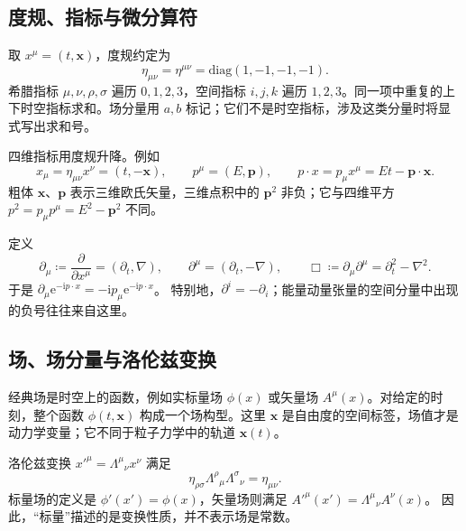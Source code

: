 \subsection{度规、指标与微分算符}

取 $x^{\mu}=(t,\bm{x})$，度规约定为
\begin{equation}
  \eta_{\mu\nu}=\eta^{\mu\nu}=\mathrm{diag}(1,-1,-1,-1).
\end{equation}
希腊指标 $\mu,\nu,\rho,\sigma$ 遍历 $0,1,2,3$，空间指标 $i,j,k$ 遍历 $1,2,3$。同一项中重复的上下时空指标求和。场分量用 $a,b$ 标记；它们不是时空指标，涉及这类分量时将显式写出求和号。

四维指标用度规升降。例如
\begin{equation}
  x_{\mu}=\eta_{\mu\nu}x^{\nu}=(t,-\bm{x}),
  \qquad p^{\mu}=(E,\bm{p}),
  \qquad p\cdot x=p_{\mu}x^{\mu}=Et-\bm{p}\cdot\bm{x}.
\end{equation}
粗体 $\bm{x}$、$\bm{p}$ 表示三维欧氏矢量，三维点积中的 $\bm{p}^{2}$ 非负；它与四维平方 $p^{2}=p_{\mu}p^{\mu}=E^{2}-\bm{p}^{2}$ 不同。

定义
\begin{equation}
  \partial_{\mu}\coloneqq\frac{\partial}{\partial x^{\mu}}
  =(\partial_{t},\nabla),\qquad
  \partial^{\mu}=(\partial_{t},-\nabla),\qquad
  \Box\coloneqq\partial_{\mu}\partial^{\mu}=\partial_{t}^{2}-\nabla^{2}.
\end{equation}
于是 $\partial_{\mu}\mathrm{e}^{-\mathrm{i}p\cdot x}
=-\mathrm{i}p_{\mu}\mathrm{e}^{-\mathrm{i}p\cdot x}$。
特别地，$\partial^{i}=-\partial_{i}$；能量动量张量的空间分量中出现的负号往往来自这里。

\subsection{场、场分量与洛伦兹变换}

经典场是时空上的函数，例如实标量场 $\phi(x)$ 或矢量场 $A^{\mu}(x)$。对给定的时刻，整个函数 $\phi(t,\bm{x})$ 构成一个场构型。这里 $\bm{x}$ 是自由度的空间标签，场值才是动力学变量；它不同于粒子力学中的轨道 $\bm{x}(t)$。

洛伦兹变换 $x'^{\mu}=\Lambda^{\mu}{}_{\nu}x^{\nu}$ 满足
\begin{equation}
  \eta_{\rho\sigma}\Lambda^{\rho}{}_{\mu}\Lambda^{\sigma}{}_{\nu}
  =\eta_{\mu\nu}.
\end{equation}
标量场的定义是 $\phi'(x')=\phi(x)$，矢量场则满足
$A'^{\mu}(x')=\Lambda^{\mu}{}_{\nu}A^{\nu}(x)$。
因此，“标量”描述的是变换性质，并不表示场是常数。

